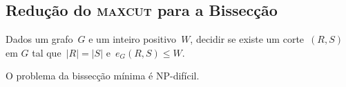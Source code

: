 

	\bigskip


\subsection{Redução do \textbf{\textsc{maxcut}} para a Bissecção}
	\begin{prob}
		Dados um grafo~${G}$
		e um inteiro positivo~${W}$, decidir se existe um
		corte~$(R,S)$ em $G$ tal 
		que~$|R|=|S|$ e~${e_G(R,S)\le W}$.
		
	\end{prob}
	\begin{teo}
		O problema da bissecção mínima é NP-difícil.
	\end{teo}
